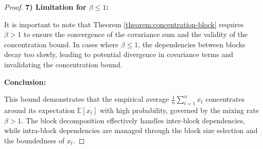 \begin{proof}
\textbf{7) Limitation for \(\beta \leq 1\):}

It is important to note that Theorem \ref{theorem:concentration-block} requires \(\beta > 1\) to ensure the convergence of the covariance sum and the validity of the concentration bound. In cases where \(\beta \leq 1\), the dependencies between blocks decay too slowly, leading to potential divergence in covariance terms and invalidating the concentration bound.

\textbf{Conclusion:}

This bound demonstrates that the empirical average \(\frac{1}{n}\sum_{t=1}^n x_t\) concentrates around its expectation \(\mathbb{E}[x_t]\) with high probability, governed by the mixing rate \(\beta > 1\). The block decomposition effectively handles inter-block dependencies, while intra-block dependencies are managed through the block size selection and the boundedness of \(x_t\).
\end{proof}